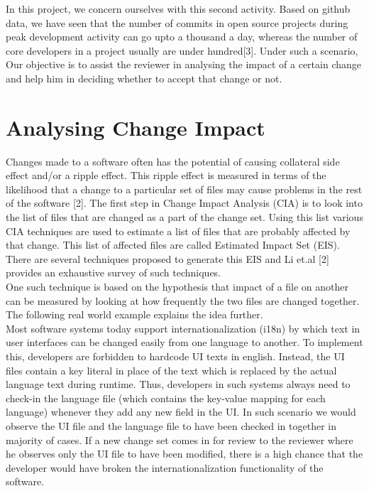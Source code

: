 In this project, we concern ourselves with this second activity. Based on github data, we have seen that the number of commits in open source projects during peak development activity can go upto a thousand a day, whereas the number of core developers in a project usually are under hundred[3]. Under such a scenario, Our objective is to assist the reviewer in analysing the impact of a certain change and help him in deciding whether to accept that change or not.\\

\section{Analysing Change Impact}

Changes made to a software often has the potential of causing collateral side effect and/or a ripple effect. This ripple effect is measured in terms of the likelihood that a change to a particular set of files may cause problems in the rest of the software [2]. The first step in Change Impact Analysis (CIA) is to look into the list of files that are changed as a part of the change set. Using this list various CIA techniques are used to estimate a list of files that are probably affected by that change. This list of affected files are called Estimated Impact Set (EIS). There are several techniques proposed to generate this EIS and Li et.al [2] provides an exhaustive survey of such techniques.\\
One such technique is based on the hypothesis that impact of a file on another can be measured by looking at how frequently the two files are changed together. The following real world example explains the idea further.\\
Most software systems today support internationalization (i18n) by which text in user interfaces can be changed easily from one language to another. To implement this, developers are forbidden to hardcode UI texts in english. Instead, the UI files contain a key literal in place of the text which is replaced by the actual language text during runtime. Thus, developers in such systems always need to check-in the language file (which contains the key-value mapping for each language) whenever they add any new field in the UI. In such scenario we would observe the UI file and the language file to have been checked in together in majority of cases. If a new change set comes in for review to the reviewer where he observes only the UI file to have been modified, there is a high chance that the developer would have broken the internationalization functionality of the software.\\

